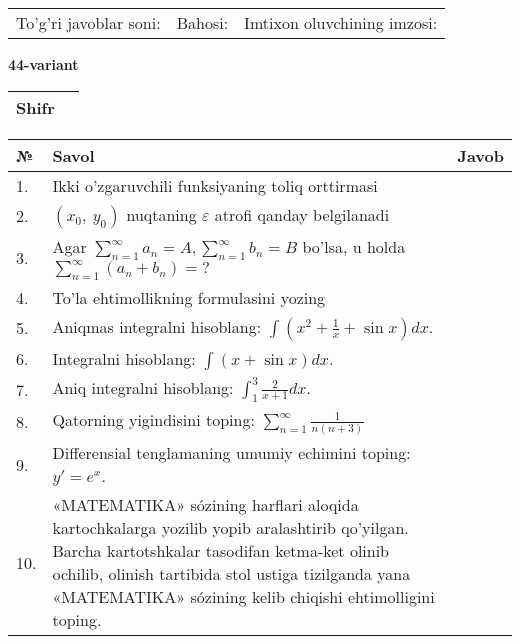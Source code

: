 \documentclass{article}
\begin{document}
  \vspace{1cm}
  
  \begin{tabular}{lll}
  To'g'ri javoblar soni: \underline{\hspace{1.5cm}} & 
  Bahosi: \underline{\hspace{1.5cm}} & 
  Imtixon oluvchining imzosi: \underline{\hspace{2cm}} \\
  \end{tabular}
  
  \egroup
  
  \newpage
  
  
  \textbf{44-variant}\\
  
  \bgroup
  \def\arraystretch{1.6} %
  
  \begin{tabular}{|m{5.7cm}|m{9.5cm}|}
  \hline
  Shifr & \\
  \hline
  \end{tabular}
  
  \vspace{1cm}
  
  \begin{tabular}{|m{0.7cm}|m{10cm}|m{4cm}|}
  \hline
  № & Savol & Javob \\
  \hline
  1. & Ikki o'zgaruvchili funksiyaning toliq orttirmasi &  \\
  \hline
  2. & \((x_{0},\ y_{0})\) nuqtaning \(\varepsilon\) atrofi qanday belgilanadi &  \\
  \hline
  3. & Agar \(\sum_{n = 1}^{\infty}a_{n} = A,\sum_{n = 1}^{\infty}b_{n} = B\) bo'lsa, u holda \(\sum_{n = 1}^{\infty}\left( a_{n} + b_{n} \right) = ?\) &  \\
  \hline
  4. & To'la ehtimollikning formulasini yozing &  \\
  \hline
  5. & Aniqmas integralni hisoblang: \(\int {\left( x^{2} + \frac{1}{x} + \sin x \right)dx}\). &  \\
  \hline
  6. & Integralni hisoblang: \(\int {(x + \sin x)dx}\). &  \\
  \hline
  7. & Aniq integralni hisoblang: \(\int_{1}^{3}\frac{2}{x + 1}dx\). &  \\
  \hline
  8. & Qatorning yigindisini toping: \(\sum_{n = 1}^{\infty}\frac{1}{n(n + 3)}\) &  \\
  \hline
  9. & Differensial tenglamaning umumiy echimini toping: \(y' = e^{x}\). &  \\
  \hline
  10. & «MATEMATIKA» sózining harflari aloqida kartochkalarga yozilib yopib aralashtirib qo'yilgan. Barcha kartotshkalar tasodifan ketma-ket olinib ochilib, olinish tartibida stol ustiga tizilganda yana «MATEMATIKA» sózining kelib chiqishi ehtimolligini toping. &  \\
  \hline
  \end{tabular}
  
\end{document}
